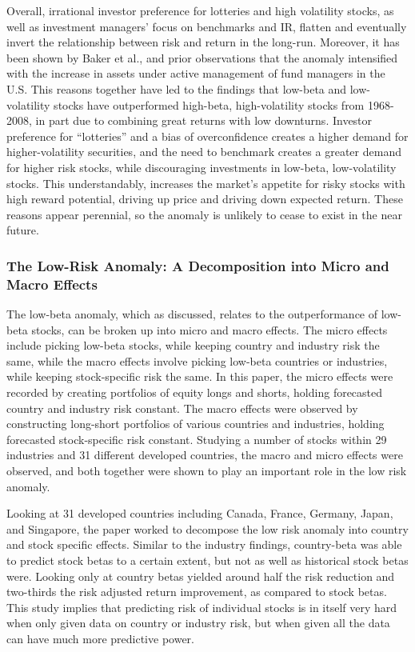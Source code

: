 \documentclass[12pt,twoside]{reedthesis}
\theoremstyle{definition}
\theoremstyle{definition}
\theoremstyle{definition}
\theoremstyle{remark}
\begin{document}
Overall, irrational investor preference for lotteries and high
volatility stocks, as well as investment managers' focus on benchmarks
and IR, flatten and eventually invert the relationship between risk and
return in the long-run. Moreover, it has been shown by Baker et al., and
prior observations that the anomaly intensified with the increase in
assets under active management of fund managers in the U.S. This reasons
together have led to the findings that low-beta and low-volatility
stocks have outperformed high-beta, high-volatility stocks from
1968-2008, in part due to combining great returns with low downturns.
Investor preference for ``lotteries'' and a bias of overconfidence
creates a higher demand for higher-volatility securities, and the need
to benchmark creates a greater demand for higher risk stocks, while
discouraging investments in low-beta, low-volatility stocks. This
understandably, increases the market's appetite for risky stocks with
high reward potential, driving up price and driving down expected
return. These reasons appear perennial, so the anomaly is unlikely to
cease to exist in the near future.

\subsubsection{The Low-Risk Anomaly: A Decomposition into Micro and
Macro
Effects}\label{the-low-risk-anomaly-a-decomposition-into-micro-and-macro-effects}

The low-beta anomaly, which as discussed, relates to the outperformance
of low-beta stocks, can be broken up into micro and macro effects. The
micro effects include picking low-beta stocks, while keeping country and
industry risk the same, while the macro effects involve picking low-beta
countries or industries, while keeping stock-specific risk the same. In
this paper, the micro effects were recorded by creating portfolios of
equity longs and shorts, holding forecasted country and industry risk
constant. The macro effects were observed by constructing long-short
portfolios of various countries and industries, holding forecasted
stock-specific risk constant. Studying a number of stocks within 29
industries and 31 different developed countries, the macro and micro
effects were observed, and both together were shown to play an important
role in the low risk anomaly.

Looking at 31 developed countries including Canada, France, Germany,
Japan, and Singapore, the paper worked to decompose the low risk anomaly
into country and stock specific effects. Similar to the industry
findings, country-beta was able to predict stock betas to a certain
extent, but not as well as historical stock betas were. Looking only at
country betas yielded around half the risk reduction and two-thirds the
risk adjusted return improvement, as compared to stock betas. This study
implies that predicting risk of individual stocks is in itself very hard
when only given data on country or industry risk, but when given all the
data can have much more predictive power.
\end{document}

